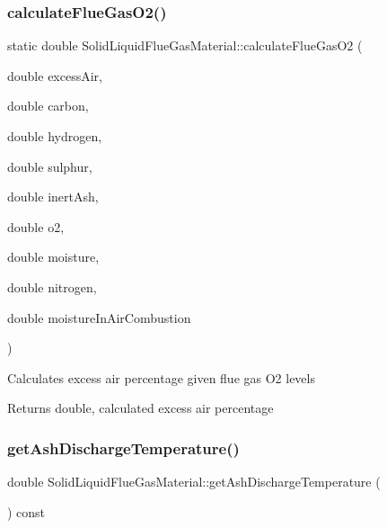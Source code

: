 \subsubsection{\texorpdfstring{calculate\+Flue\+Gas\+O2()}{calculateFlueGasO2()}\hspace{0.1cm}{\footnotesize\ttfamily [3/3]}}
{\footnotesize\ttfamily static double Solid\+Liquid\+Flue\+Gas\+Material\+::calculate\+Flue\+Gas\+O2 (\begin{DoxyParamCaption}\item[{double}]{excess\+Air,  }\item[{double}]{carbon,  }\item[{double}]{hydrogen,  }\item[{double}]{sulphur,  }\item[{double}]{inert\+Ash,  }\item[{double}]{o2,  }\item[{double}]{moisture,  }\item[{double}]{nitrogen,  }\item[{double}]{moisture\+In\+Air\+Combustion }\end{DoxyParamCaption})\hspace{0.3cm}{\ttfamily [static]}}

Calculates excess air percentage given flue gas O2 levels \begin{DoxyReturn}{Returns}
double, calculated excess air percentage 
\end{DoxyReturn}
\mbox{\label{class_solid_liquid_flue_gas_material_ab233d4e27397cc74fbe2d3084e4e6f7c}} 
\subsubsection{\texorpdfstring{get\+Ash\+Discharge\+Temperature()}{getAshDischargeTemperature()}\hspace{0.1cm}{\footnotesize\ttfamily [1/3]}}
{\footnotesize\ttfamily double Solid\+Liquid\+Flue\+Gas\+Material\+::get\+Ash\+Discharge\+Temperature (\begin{DoxyParamCaption}{ }\end{DoxyParamCaption}) const\hspace{0.3cm}{\ttfamily [inline]}}

